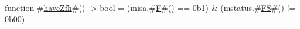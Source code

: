 function #\hyperref[sailRISCVzhaveZfh]{haveZfh}#()     -> bool = (misa.#\hyperref[sailRISCVzF]{F}#() == 0b1) & (mstatus.#\hyperref[sailRISCVzFS]{FS}#() != 0b00)
